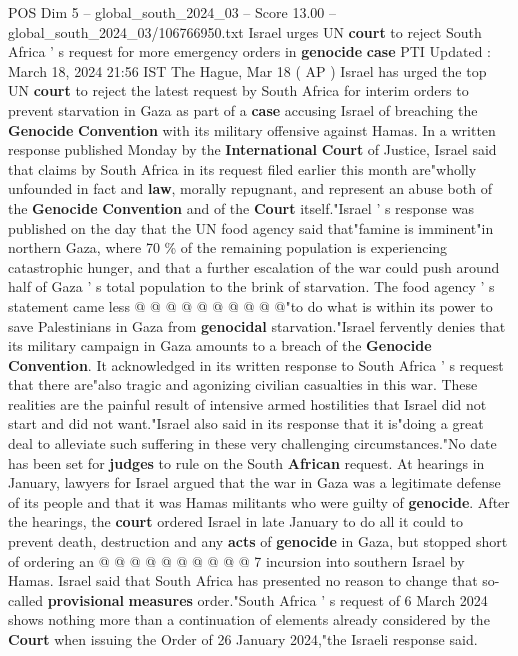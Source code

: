 \begin{textsample}{POS Dim 5 – global\_south\_2024\_03 – Score 13.00 – global\_south\_2024\_03/106766950.txt}  \label{ex:f5_pos_146}
Israel urges UN \textbf{court} to reject South Africa ' s request for more emergency orders in \textbf{genocide} \textbf{case} PTI Updated : March 18, 2024 21:56 IST The Hague, Mar 18 ( AP ) Israel has urged the top UN \textbf{court} to reject the latest request by South Africa for interim orders to prevent starvation in Gaza as part of a \textbf{case} accusing Israel of breaching the \textbf{Genocide} \textbf{Convention} with its military offensive against Hamas.
In a written response published Monday by the \textbf{International} \textbf{Court} of Justice, Israel said that claims by South Africa in its request filed earlier this month are"wholly unfounded in fact and \textbf{law}, morally repugnant, and represent an abuse both of the \textbf{Genocide} \textbf{Convention} and of the \textbf{Court} itself."Israel ' s response was published on the day that the UN food agency said that"famine is imminent"in northern Gaza, where 70 \% of the remaining population is experiencing catastrophic hunger, and that a further escalation of the war could push around half of Gaza ' s total population to the brink of starvation.
The food agency ' s statement came less @ @ @ @ @ @ @ @ @ @"to do what is within its power to save Palestinians in Gaza from \textbf{genocidal} starvation."Israel fervently denies that its military campaign in Gaza amounts to a breach of the \textbf{Genocide} \textbf{Convention}.
It acknowledged in its written response to South Africa ' s request that there are"also tragic and agonizing civilian casualties in this war.
These realities are the painful result of intensive armed hostilities that Israel did not start and did not want."Israel also said in its response that it is"doing a great deal to alleviate such suffering in these very challenging circumstances."No date has been set for \textbf{judges} to rule on the South \textbf{African} request.
At hearings in January, lawyers for Israel argued that the war in Gaza was a legitimate defense of its people and that it was Hamas militants who were guilty of \textbf{genocide}.
After the hearings, the \textbf{court} ordered Israel in late January to do all it could to prevent death, destruction and any \textbf{acts} of \textbf{genocide} in Gaza, but stopped short of ordering an @ @ @ @ @ @ @ @ @ @ 7 incursion into southern Israel by Hamas.
Israel said that South Africa has presented no reason to change that so-called \textbf{provisional} \textbf{measures} order."South Africa ' s request of 6 March 2024 shows nothing more than a continuation of elements already considered by the \textbf{Court} when issuing the Order of 26 January 2024,"the Israeli response said.

\end{textsample}

